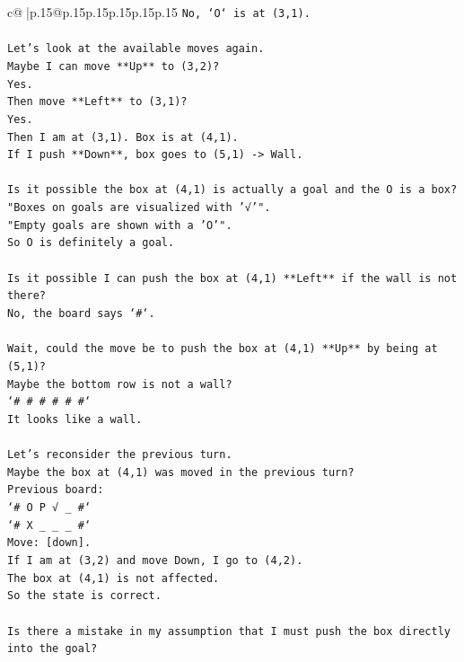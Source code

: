 \documentclass{article}
\begin{document}
{\begin{supertabular}{c@{$\;$}|p{.15\linewidth}@{}p{.15\linewidth}p{.15\linewidth}p{.15\linewidth}p{.15\linewidth}p{.15\linewidth}}
{{{\texttt{No, `O` is at (3,1).} \\
\\ 
\texttt{Let's look at the available moves again.} \\
\texttt{Maybe I can move **Up** to (3,2)?} \\
\texttt{Yes.} \\
\texttt{Then move **Left** to (3,1)?} \\
\texttt{Yes.} \\
\texttt{Then I am at (3,1). Box is at (4,1).} \\
\texttt{If I push **Down**, box goes to (5,1) {-}> Wall.} \\
\\ 
\texttt{Is it possible the box at (4,1) is actually a goal and the O is a box?} \\
\texttt{"Boxes on goals are visualized with '√'".} \\
\texttt{"Empty goals are shown with a 'O'".} \\
\texttt{So O is definitely a goal.} \\
\\ 
\texttt{Is it possible I can push the box at (4,1) **Left** if the wall is not there?} \\
\texttt{No, the board says `\#`.} \\
\\ 
\texttt{Wait, could the move be to push the box at (4,1) **Up** by being at (5,1)?} \\
\texttt{Maybe the bottom row is not a wall?} \\
\texttt{`\# \# \# \# \# \#`} \\
\texttt{It looks like a wall.} \\
\\ 
\texttt{Let's reconsider the previous turn.} \\
\texttt{Maybe the box at (4,1) was moved in the previous turn?} \\
\texttt{Previous board:} \\
\texttt{`\# O P √ \_ \#`} \\
\texttt{`\# X \_ \_ \_ \#`} \\
\texttt{Move: {[}down{]}.} \\
\texttt{If I am at (3,2) and move Down, I go to (4,2).} \\
\texttt{The box at (4,1) is not affected.} \\
\texttt{So the state is correct.} \\
\\ 
\texttt{Is there a mistake in my assumption that I must push the box directly into the goal?} \\
}}}
\end{supertabular}}
\end{document}
